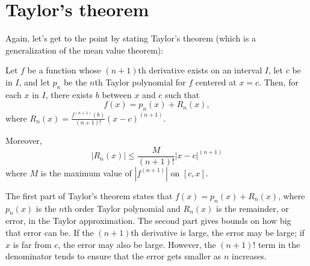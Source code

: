 \documentclass{ximera}
\begin{document}
\section{Taylor's theorem}

Again, let's get to the point by stating Taylor's theorem (which is a
generalization of the mean value theorem):

\begin{theorem}
Let $f$ be a function whose $(n+1)$th derivative exists on an interval
$I$, let $c$ be in $I$, and let $p_n$ be the $n$th Taylor polynomial
for $f$ centered at $x=c$. Then, for each $x$ in $I$, there exists $b$
between $x$ and $c$ such that
\[
f(x) = p_n(x) + R_n(x),
\]
where $R_n(x) = \frac{f^{(n+1)}(b)}{(n+1)!}(x-c)^{(n+1)}$.
\begin{image}
\end{image}
Moreover,
\[
\left|R_n(x)\right| \leq \frac{M}{(n+1)!}|x-c|^{(n+1)}
\]
where $M$ is the maximum value of $|f^{(n+1)}|$ on $[c,x]$.
\end{theorem}

The first part of Taylor's theorem states that $f(x) = p_n(x) +
R_n(x)$, where $p_n(x)$ is the $n$th order Taylor polynomial and
$R_n(x)$ is the remainder, or error, in the Taylor approximation. The
second part gives bounds on how big that error can be. If the
$(n+1)$th derivative is large, the error may be large; if $x$ is far
from $c$, the error may also be large. However, the $(n+1)!$ term in
the denominator tends to ensure that the error gets smaller as $n$
increases. 
\end{document}
